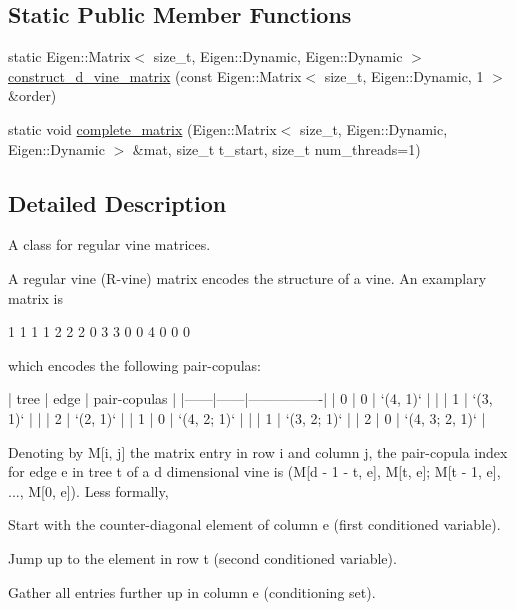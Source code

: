 \subsection*{Static Public Member Functions}
\begin{DoxyCompactItemize}
\item 
static Eigen\+::\+Matrix$<$ size\+\_\+t, Eigen\+::\+Dynamic, Eigen\+::\+Dynamic $>$ \hyperlink{classvinecopulib_1_1_r_vine_matrix_ad523b84e2ea41eba4eb982eb9b39471b}{construct\+\_\+d\+\_\+vine\+\_\+matrix} (const Eigen\+::\+Matrix$<$ size\+\_\+t, Eigen\+::\+Dynamic, 1 $>$ \&order)
\item 
static void \hyperlink{classvinecopulib_1_1_r_vine_matrix_ae27243770904a218e4e1e5b939ad46fb}{complete\+\_\+matrix} (Eigen\+::\+Matrix$<$ size\+\_\+t, Eigen\+::\+Dynamic, Eigen\+::\+Dynamic $>$ \&mat, size\+\_\+t t\+\_\+start, size\+\_\+t num\+\_\+threads=1)
\end{DoxyCompactItemize}


\subsection{Detailed Description}
A class for regular vine matrices. 

A regular vine (R-\/vine) matrix encodes the structure of a vine. An examplary matrix is 
\begin{DoxyCode}
1 1 1 1
2 2 2 0
3 3 0 0
4 0 0 0
\end{DoxyCode}
 which encodes the following pair-\/copulas\+: 
\begin{DoxyCode}
| tree | edge | pair-copulas   |
|------|------|----------------|
| 0    | 0    | `(4, 1)`       |
|      | 1    | `(3, 1)`       |
|      | 2    | `(2, 1)`       |
| 1    | 0    | `(4, 2; 1)`    |
|      | 1    | `(3, 2; 1)`    |
| 2    | 0    | `(4, 3; 2, 1)` |
\end{DoxyCode}
 Denoting by {\ttfamily M\mbox{[}i, j\mbox{]}} the matrix entry in row {\ttfamily i} and column {\ttfamily j}, the pair-\/copula index for edge {\ttfamily e} in tree {\ttfamily t} of a {\ttfamily d} dimensional vine is {\ttfamily (M\mbox{[}d -\/ 1 -\/ t, e\mbox{]}, M\mbox{[}t, e\mbox{]}; M\mbox{[}t -\/ 1, e\mbox{]}, ..., M\mbox{[}0, e\mbox{]})}. Less formally,
\begin{DoxyEnumerate}
\item Start with the counter-\/diagonal element of column {\ttfamily e} (first conditioned variable).
\item Jump up to the element in row {\ttfamily t} (second conditioned variable).
\item Gather all entries further up in column {\ttfamily e} (conditioning set).
\end{DoxyEnumerate}

